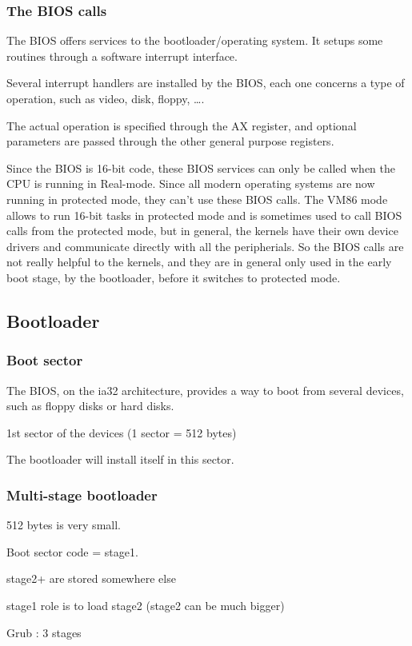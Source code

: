 \begin{frame}
  \frametitle{The BIOS calls}

  The BIOS offers services to the bootloader/operating system. It setups some routines through a software interrupt interface.

  \-

  Several interrupt handlers are installed by the BIOS, each one concerns a type of operation, such as video, disk, floppy, \ldots.

  \-

  The actual operation is specified through the AX register, and optional parameters are passed through the other general purpose registers.

  \-

  Since the BIOS is 16-bit code, these BIOS services can only be called when the CPU is running in Real-mode. Since all modern operating systems are now running in protected mode, they can't use these BIOS calls. The VM86 mode allows to run 16-bit tasks in protected mode and is sometimes used to call BIOS calls from the protected mode, but in general, the kernels have their own device drivers and communicate directly with all the peripherials. So the BIOS calls are not really helpful to the kernels, and they are in general only used in the early boot stage, by the bootloader, before it switches to protected mode.

\end{frame}

\subsection{Bootloader}

\begin{frame}
  \frametitle{Boot sector}

  The BIOS, on the ia32 architecture, provides a way to boot from several devices, such as floppy disks or hard disks.

  \-

  1st sector of the devices (1 sector = 512 bytes)

  \-

  The bootloader will install itself in this sector.

\end{frame}

\begin{frame}
  \frametitle{Multi-stage bootloader}

  512 bytes is very small.

  \-

  Boot sector code = stage1.

  \-

  stage2+ are stored somewhere else

  \-

  stage1 role is to load stage2 (stage2 can be much bigger)

  \-

  Grub : 3 stages

\end{frame}

